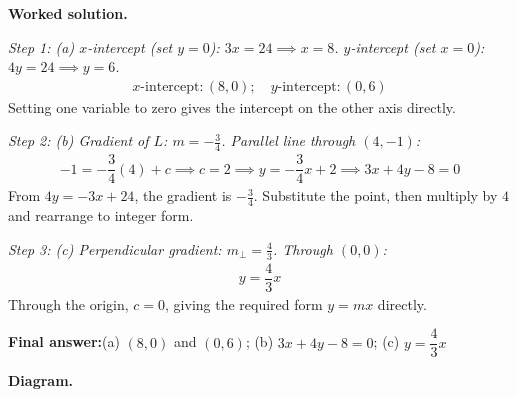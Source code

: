 \documentclass[11pt]{article}
\begin{document}
\textbf{Worked solution.}

\textit{Step 1: (a) \( x \)-intercept (set \( y=0 \)): \( 3x = 24 \implies x = 8 \). \( y \)-intercept (set \( x=0 \)): \( 4y = 24 \implies y = 6 \).}
\[\begin{gathered}
x\text{-intercept}: (8, 0); \quad y\text{-intercept}: (0, 6)
\end{gathered}\]
Setting one variable to zero gives the intercept on the other axis directly.

\textit{Step 2: (b) Gradient of \( L \): \( m = -\frac{3}{4} \). Parallel line through \( (4, -1) \):}
\[\begin{gathered}
-1 = -\dfrac{3}{4}(4) + c \implies c = 2 \implies y = -\dfrac{3}{4}x + 2 \implies 3x + 4y - 8 = 0
\end{gathered}\]
From \( 4y = -3x + 24 \), the gradient is \( -\tfrac{3}{4} \). Substitute the point, then multiply by \( 4 \) and rearrange to integer form.

\textit{Step 3: (c) Perpendicular gradient: \( m_\perp = \frac{4}{3} \). Through \( (0, 0) \):}
\[\begin{gathered}
y = \dfrac{4}{3}x
\end{gathered}\]
Through the origin, \( c = 0 \), giving the required form \( y = mx \) directly.

\begin{answerbox}
\textbf{Final answer:}\quad (a) \(\displaystyle (8,0)\) and \(\displaystyle (0,6)\); (b) \(\displaystyle 3x+4y-8=0\); (c) \(\displaystyle y=\dfrac{4}{3}x\)
\end{answerbox}
\textbf{Diagram.}
\end{document}
